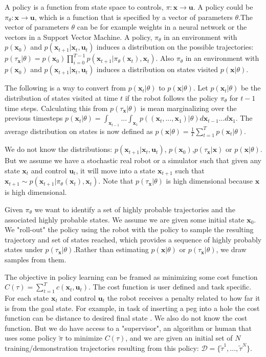 \documentclass[10pt, conference]{ieeeconf}      %
\newcommand{\bu}{\mathbf{u}}
\newcommand{\bx}{\mathbf{x}}
\begin{document}
A policy is a function from state space to controls, $\pi: \bx \rightarrow \bu$. A policy could be $\pi_\theta: \bx \rightarrow \mathbf{u}$, which is a  function that is specified by a vector of parameters  $\theta$.The vector of parameters $\theta$ can be for example weights in a neural network or the  vectors in a Support Vector Machine. A policy, $\pi_{\theta}$ in an environment with $p(\bx_0)$ and $p(\bx_{t+1}|\bx_t,\bu_t)$ induces a distribution on the possible trajectories:$ p(\tau_\bx | \theta)= p(\bx_0)\prod_{i=0}^{T-1}p(\bx_{t+1}|\pi_{\theta}(\bx_t),\bx_t)$. Also $\pi_{\theta}$ in an environment with $p(\bx_0)$ and $p(\bx_{t+1}|\bx_t,\bu_t)$  induces a distribution on states visited $p(\mathbf{x}|\theta)$. 

 The following is a way to convert from $p(\bx_t|\theta)$ to $p(\bx|\theta)$. Let $p(\bx_t|\theta)$ be the distribution of states visited at time $t$ if the robot follows the policy $\pi_{\theta}$ for $t-1$ time steps. Calculating this from $p(\tau_{\bx}|\theta)$ is mean marginalizing over the previous timesteps $p(\bx_t|\theta) = \int_{\bx_{t-1}}...\int_{\bx_1} p((\bx_t,...,\bx_1)|\theta) d\bx_{t-1}...d\bx_1$. The average distribution on states is now defined as $p(\bx|\theta) = \frac{1}{T} \sum^T_{t=1} p(\bx_t|\theta)$.



We do not know the distributions: $p(\bx_{t+1}|\bx_t,\bu_t)$, $p(\bx_0)$,$p(\tau_{\bx}|
\bx)$ or $p(\bx|\theta)$. But we assume we have a stochastic real robot or a simulator such that given any state $\bx_t$ and control $\bu_t$, it will move into a state $\bx_{t+1}$ such that $\bx_{t+1} \sim p(\bx_{t+1}|\pi_{\theta}(\bx_t),\bx_t)$. Note that $p(\tau_{\bx}|\theta)$ is high dimensional because $\bx$ is high dimensional. 

Given $\pi_{\theta}$ we want to identify a set of highly probable trajectories and the associated highly probable states. We assume we are given some initial state $\bx_0$. We  "roll-out" the policy using the robot with the policy to sample the resulting trajectory and set of states reached, which provides a sequence of highly probably states under $p(\tau_{\bx}|\theta)$.Rather than estimating $p(\bx|\theta)$ or $p(\tau_{\bx}|\theta)$, we draw samples from them. 


The objective in policy learning can be framed as minimizing some cost function $C(\tau) = \sum^T_{t=1} c(\bx_t,\bu_t)$. The cost function is user defined and task specific. For each state $\bx_{t}$ and control $\bu_t$ the robot receives a penalty related to how far it is from the goal state. For example, in task of inserting a peg into a hole the cost function can be distance to desired final state \cite{levine2015end}.  We also do not know the cost function. But we do have access to a "supervisor", an algorithm or human that uses some policy $\tilde{\pi}$ to minimize $C(\tau)$, and we are given an initial set of $N$ training/demonstration trajectories resulting from this policy: $\mathcal{D} = \lbrace \tilde{\tau}^1,...,\tilde{\tau}^N \rbrace$. 
\end{document}
